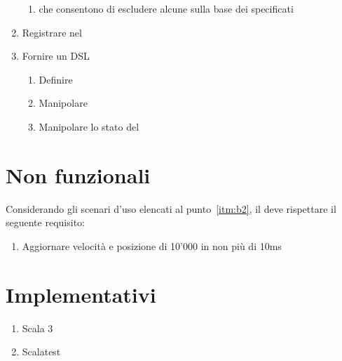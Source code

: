 \begin{enumerate}[label=\textbf{\ref{sec:funzionali}.\arabic*}]
\begin{enumerate}[label=\textbf{\ref{itm:f7}.\arabic*}]
        \item \label{itm:ff11} \System che consentono di escludere alcune \Entity sulla base dei \Component specificati
    \end{enumerate}
    \item \label{itm:f8} Registrare \System nel \World
    \item \label{itm:f9} Fornire un DSL
    \begin{enumerate}[label=\textbf{\ref{itm:f9}.\arabic*}]
        \item \label{itm:ff12} Definire \System
        \item \label{itm:ff13} Manipolare \Entity
        \item \label{itm:ff14} Manipolare lo stato del \World
    \end{enumerate}
\end{enumerate}


\section{Non funzionali}\label{sec:non-funzionali}
Considerando gli scenari d'uso elencati al punto~\ref{itm:b2}, il \System deve rispettare il seguente requisito:
\begin{enumerate}[label=\textbf{\ref{sec:non-funzionali}.\arabic*}]
    \item \label{itm:nf1} Aggiornare velocità e posizione di 10'000 \Entity in non più di 10ms
\end{enumerate}


\section{Implementativi}\label{sec:implementativi}
\begin{enumerate}[label=\textbf{\ref{sec:implementativi}.\arabic*}]
    \item \label{itm:i1} Scala 3
    \item \label{itm:i2} Scalatest\cite{scalatest}
\end{enumerate}